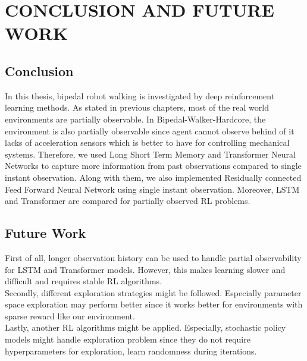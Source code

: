 \chapter{CONCLUSION AND FUTURE WORK}
\label{chap:conclusion}
\section{Conclusion}
In this thesis, bipedal robot walking is investigated by deep  reinforcement learning methods. As stated in previous chapters, most of the real world environments are partially observable. In Bipedal-Walker-Hardcore, the environment is also partially observable since agent cannot observe behind of it lacks of acceleration sensors which is better to have for controlling mechanical systems. Therefore, we used Long Short Term Memory and Transformer Neural Networks to capture more information from past observations compared to single instant observation. Along with them, we also implemented Residually connected Feed Forward Neural Network using single instant observation. Moreover, LSTM and Transformer are compared for partially observed RL problems. 
\section{Future Work}
First of all, longer observation history can be used to handle partial observability for LSTM and Transformer models. However, this makes learning slower and difficult and requires stable RL algorithms. \\
Secondly, different exploration strategies might be followed. Especially parameter space exploration \cite{plappert_parameter_2018} may perform better since it works better for environments with sparse reward like our environment. \\
Lastly, another RL algorithms might be applied. Especially, stochastic policy models might handle exploration problem since they do not require hyperparameters for exploration, learn randomness during iterations.